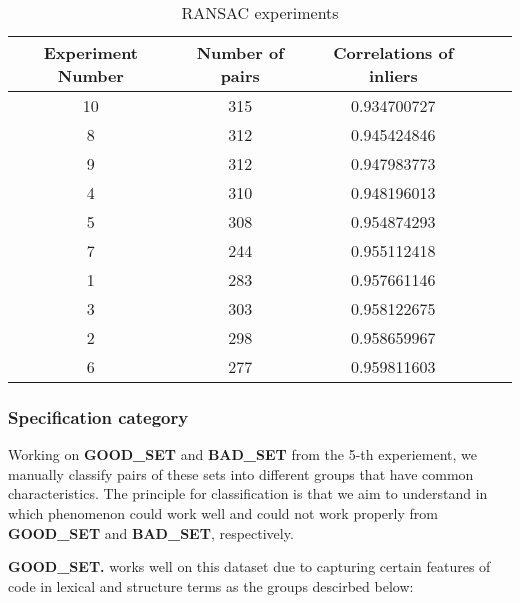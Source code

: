 
\begin{table}
	\caption{RANSAC experiments}
	\begin{tabular}{|c|c|c|c|c|}
		\hline
		Experiment Number & Number of pairs & Correlations of inliers \\
		\hline
		10	& 315	& 0.934700727 \\		
		8	& 312	& 0.945424846 \\	
		9	& 312	& 0.947983773 \\
		4	& 310	& 0.948196013 \\
		{\cellcolor[gray]{.8}}5	& {\cellcolor[gray]{.8}}308	& {\cellcolor[gray]{.8}}0.954874293 \\
		7	& 244	& 0.955112418 \\	
		1	& 283	& 0.957661146 \\
		3	& 303	& 0.958122675 \\
		2	& 298	& 0.958659967 \\
		6	& 277	& 0.959811603 \\		
		\hline
	\end{tabular}
	\label{table:RANSAC_experiments}
\end{table}


\subsubsection{Specification category}
Working on \textbf{GOOD\_SET} and \textbf{BAD\_SET} from the 5-th experiement, we manually classify pairs of these sets into different groups that have common characteristics.
The principle for classification is that we aim to understand in which phenomenon {\model} could work well and could not work properly from \textbf{GOOD\_SET} and \textbf{BAD\_SET}, respectively.


\textbf{GOOD\_SET.} {\model} works well on this dataset due to capturing certain features of code in lexical and structure terms as the groups descirbed below:

